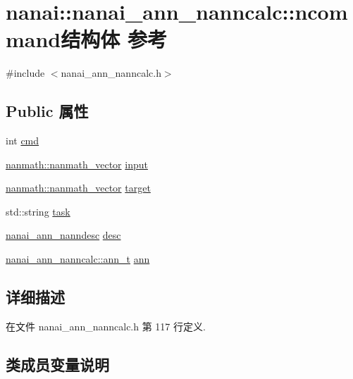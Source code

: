 \hypertarget{structnanai_1_1nanai__ann__nanncalc_1_1ncommand}{}\section{nanai\+:\+:nanai\+\_\+ann\+\_\+nanncalc\+:\+:ncommand结构体 参考}
\label{structnanai_1_1nanai__ann__nanncalc_1_1ncommand}


{\ttfamily \#include $<$nanai\+\_\+ann\+\_\+nanncalc.\+h$>$}

\subsection*{Public 属性}
\begin{DoxyCompactItemize}
\item 
int \hyperlink{structnanai_1_1nanai__ann__nanncalc_1_1ncommand_a4a61797e6f5a657c50a34a5fb3abda56}{cmd}
\item 
\hyperlink{classnanmath_1_1nanmath__vector}{nanmath\+::nanmath\+\_\+vector} \hyperlink{structnanai_1_1nanai__ann__nanncalc_1_1ncommand_acb609b08ab6f835678886dfeec79da71}{input}
\item 
\hyperlink{classnanmath_1_1nanmath__vector}{nanmath\+::nanmath\+\_\+vector} \hyperlink{structnanai_1_1nanai__ann__nanncalc_1_1ncommand_afd7d33dcebc41d012eeef46b346e9854}{target}
\item 
std\+::string \hyperlink{structnanai_1_1nanai__ann__nanncalc_1_1ncommand_a2355346d40218889f8de46778110deec}{task}
\item 
\hyperlink{namespacenanai_a892a8c80381d0005a076b68fbbf2d918}{nanai\+\_\+ann\+\_\+nanndesc} \hyperlink{structnanai_1_1nanai__ann__nanncalc_1_1ncommand_ad5b646ce90221dc90cc161b8293ba0eb}{desc}
\item 
\hyperlink{classnanai_1_1nanai__ann__nanncalc_1_1ann__t}{nanai\+\_\+ann\+\_\+nanncalc\+::ann\+\_\+t} \hyperlink{structnanai_1_1nanai__ann__nanncalc_1_1ncommand_a64d0d3494fb258a2d7dc7770b7a1da96}{ann}
\end{DoxyCompactItemize}


\subsection{详细描述}


在文件 nanai\+\_\+ann\+\_\+nanncalc.\+h 第 117 行定义.



\subsection{类成员变量说明}
\hypertarget{structnanai_1_1nanai__ann__nanncalc_1_1ncommand_a64d0d3494fb258a2d7dc7770b7a1da96}{}
